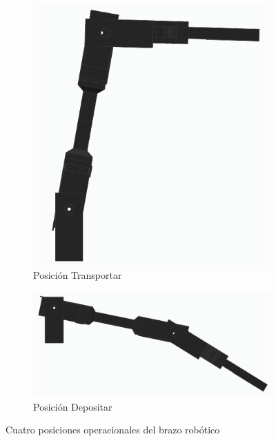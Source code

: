 \begin{figure}[H]
    \begin{subfigure}[b]{0.4\textwidth}
        \centering
        \includegraphics[width=\textwidth]{imagenes/brazo_transportar.png}
        \caption{Posición Transportar}
    \end{subfigure}
    \hfill
    \begin{subfigure}[b]{0.4\textwidth}
        \centering
        \includegraphics[width=\textwidth]{imagenes/brazo_depositar.png}
        \caption{Posición Depositar}
    \end{subfigure}
    \caption{Cuatro posiciones operacionales del brazo robótico}
    \label{fig:posiciones_brazo}
\end{figure}

